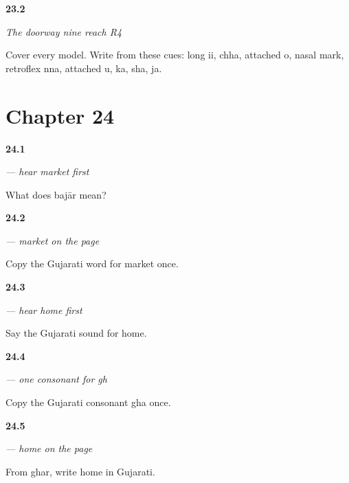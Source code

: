 \noindent\begin{minipage}[t]{\linewidth}
\raggedright
\hypertarget{review-GU-R19-doorway-nine-r4-dictation}{\textbf{23.2}} \emph{The doorway nine reach R4}\par
\small Cover every model. Write from these cues: long ii, chha, attached o, nasal mark, retroflex nna, attached u, ka, sha, ja.
\end{minipage}\par\medskip

\section*{Chapter 24}

\noindent\begin{minipage}[t]{\linewidth}
\raggedright
\hypertarget{review-GU-C20-hear-bajar-recall}{\textbf{24.1}} \emph{ — hear market first}\par
\small What does bajār mean?
\end{minipage}\par\medskip

\noindent\begin{minipage}[t]{\linewidth}
\raggedright
\hypertarget{review-GU-C20-bajar-copy}{\textbf{24.2}} \emph{ — market on the page}\par
\small Copy the Gujarati word for market once.
\end{minipage}\par\medskip

\noindent\begin{minipage}[t]{\linewidth}
\raggedright
\hypertarget{review-GU-C20-hear-ghar-recall}{\textbf{24.3}} \emph{ — hear home first}\par
\small Say the Gujarati sound for home.
\end{minipage}\par\medskip

\noindent\begin{minipage}[t]{\linewidth}
\raggedright
\hypertarget{review-GU-W20-gha-copy}{\textbf{24.4}} \emph{ — one consonant for gh}\par
\small Copy the Gujarati consonant gha once.
\end{minipage}\par\medskip

\noindent\begin{minipage}[t]{\linewidth}
\raggedright
\hypertarget{review-GU-C20-ghar-write}{\textbf{24.5}} \emph{ — home on the page}\par
\small From ghar, write home in Gujarati.
\end{minipage}\par\medskip

